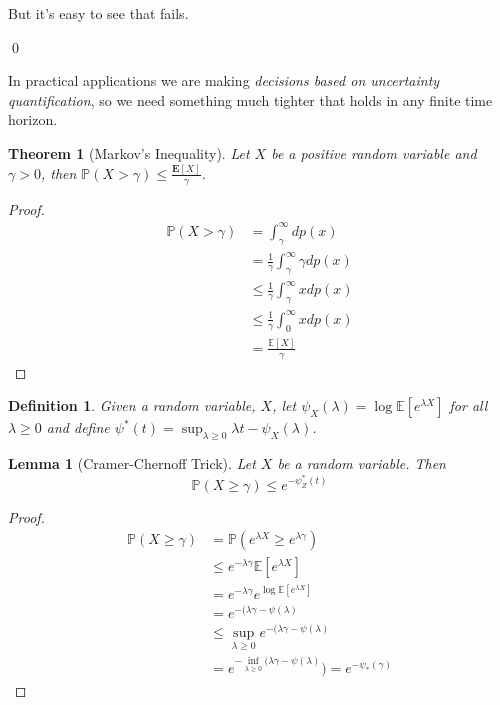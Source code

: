\documentclass[11pt]{article}
\newtheorem{theorem}{Theorem}
\newtheorem{lemma}{Lemma}
\newtheorem{definition}{Definition}
\renewcommand{\P}{\mathbb{P}}
\newcommand{\E}{\mathbb{E}}
\newcommand{\1}[1]{\mathbf{1}\left\{#1\right\}}
\begin{document}
But it's easy to see that fails. 

\qed



In practical applications we are making \textit{decisions based on uncertainty quantification}, so we need something much tighter that holds in any finite time horizon.

\begin{theorem}[Markov's Inequality]
    Let $X$ be a positive random variable and $\gamma > 0$, then $\P(X > \gamma) \leq \frac{\mathbf{E}[X]}{\gamma}$.
\end{theorem}
\begin{proof}
    \begin{align*}
        \P(X > \gamma)
        &= \int_{\gamma}^{\infty} dp(x)\\
        &= \frac{1}{\gamma}\int_{\gamma}^{\infty} \gamma dp(x)\\
        &\leq \frac{1}{\gamma}\int_{\gamma}^{\infty} x dp(x)\\
        &\leq \frac{1}{\gamma}\int_{0}^{\infty} x dp(x)\\
        &= \frac{\E[X]}{\gamma}
    \end{align*}
\end{proof}

\begin{definition}
    Given a random variable, $X$, let $\psi_X(\lambda) = \log\E[e^{\lambda X}]$ for all $\lambda \geq 0$ and define $\psi^{\ast}(t) = \sup_{\lambda \geq 0} \lambda t - \psi_X(\lambda)$.
\end{definition}

\begin{lemma}[Cramer-Chernoff Trick]
Let $X$ be a random variable. Then 
\[\P(X \geq \gamma) \leq e^{-\psi^{\ast}_Z(t)}\]
\end{lemma}
\begin{proof}
    \begin{align*}
        \P(X \geq \gamma) 
        &= \P(e^{\lambda X} \geq e^{\lambda\gamma})\\
        &\leq e^{-\lambda \gamma}\E[e^{\lambda X}]\tag{Markov's Inequality}\\
        &= e^{-\lambda \gamma}e^{\log\E[e^{\lambda X}]}\\
        &= e^{-(\lambda \gamma - \psi(\lambda)}\\
        &\leq \sup_{\lambda \geq 0} e^{-(\lambda \gamma - \psi(\lambda)}\\
        &= e^{-\inf_{\lambda \geq 0}(\lambda \gamma - \psi(\lambda)})
        = e^{-\psi_{\ast}(\gamma)}
    \end{align*}
\end{proof}
\end{document}
